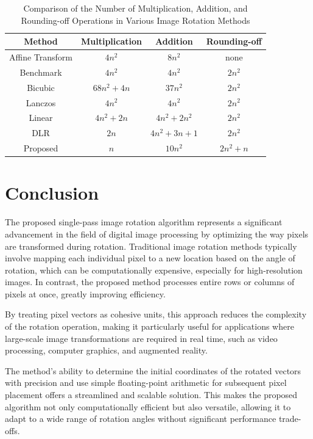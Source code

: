 \documentclass[conference]{IEEEtran}
\begin{document}
\begin{table}[h!]
    \centering
    \captionsetup{justification=centering}
    \caption{Comparison of the Number of Multiplication, Addition, and Rounding-off Operations in Various Image Rotation Methods}
    \begin{tabular}{|c|c|c|c|}
    \hline
    \textbf{Method}           & \textbf{Multiplication} & \textbf{Addition}   & \textbf{Rounding-off} \\ \hline
    Affine Transform          & $4n^2$                 & $8n^2$              & none                      \\ \hline
    Benchmark                 & $4n^2$                 & $4n^2$              & $2n^2$                  \\ \hline
    Bicubic                   & $68n^2 + 4n$           & $37n^2$             & $2n^2$                  \\ \hline
    Lanczos                   & $4n^2$                 & $4n^2$              & $2n^2$                  \\ \hline
    Linear                    & $4n^2 + 2n$            & $4n^2 + 2n^2$       & $2n^2$                  \\ \hline
    DLR                       & $2n$                   & $4n^2 + 3n + 1$     & $2n^2$                  \\ \hline
    Proposed                  & $n$                    & $10n^2$             & $2n^2 + n$              \\ \hline
    \end{tabular}
    \label{tab:no_computations}
\end{table}


\section{Conclusion}

The proposed single-pass image rotation algorithm represents a significant advancement in the field of digital image processing by optimizing the way pixels are transformed during rotation. Traditional image rotation methods typically involve mapping each individual pixel to a new location based on the angle of rotation, which can be computationally expensive, especially for high-resolution images. In contrast, the proposed method processes entire rows or columns of pixels at once, greatly improving efficiency.

By treating pixel vectors as cohesive units, this approach reduces the complexity of the rotation operation, making it particularly useful for applications where large-scale image transformations are required in real time, such as video processing, computer graphics, and augmented reality. 

The method's ability to determine the initial coordinates of the rotated vectors with precision and use simple floating-point arithmetic for subsequent pixel placement offers a streamlined and scalable solution. This makes the proposed algorithm not only computationally efficient but also versatile, allowing it to adapt to a wide range of rotation angles without significant performance trade-offs.





\end{document}
